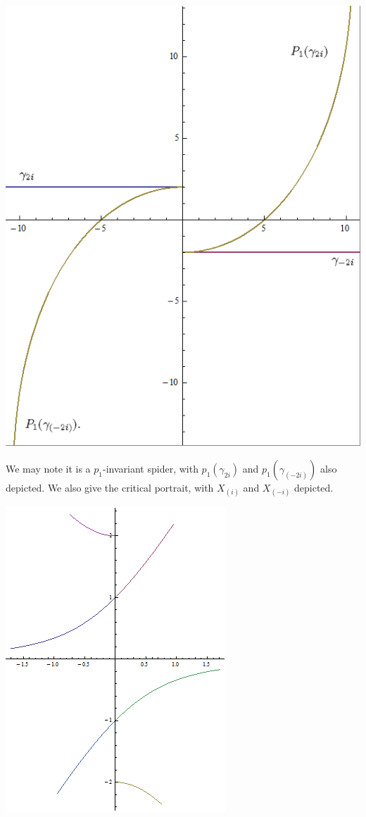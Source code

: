 \documentclass[11pt]{amsart}
\theoremstyle{definition}
\theoremstyle{remark}
\numberwithin{equation}{section}
\begin{document}
\begin{center}
\includegraphics[scale=0.4]{plus_3z_spider.png}
\end{center}

We may note it is a $p_1$-invariant spider, with $p_1(\gamma_{2i})$ and $p_1(\gamma_{(-2i)})$ also depicted. We also give the critical portrait, with $X_{(i)}$ and $X_{(-i)}$ depicted.\\

\begin{center}
\includegraphics[scale=0.5]{plus3zcritical.png}
\end{center}
\end{document}
